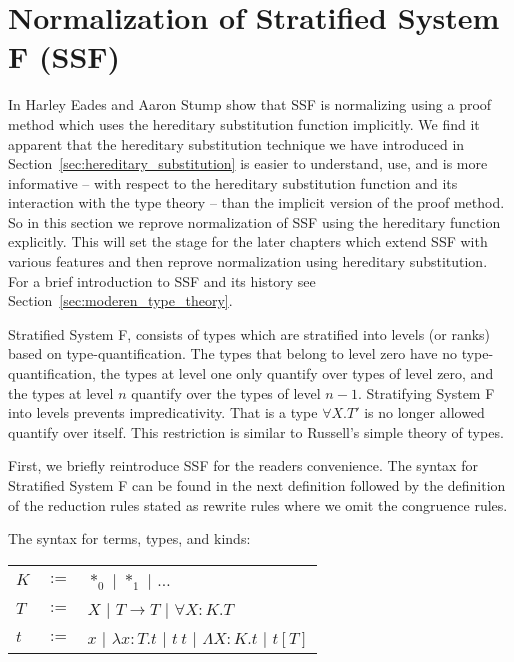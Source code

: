 \section{Normalization of Stratified System F (SSF)}
\label{subsec:normalization_stratified_system_f}
In \cite{Eades:2010} Harley Eades and Aaron Stump show that SSF is
normalizing using a proof method which uses the hereditary
substitution function implicitly.  We find it apparent that the
hereditary substitution technique we have introduced in
Section~\ref{sec:hereditary_substitution} is easier to understand,
use, and is more informative -- with respect to the hereditary
substitution function and its interaction with the type theory -- than
the implicit version of the proof method.  So in this section we
reprove normalization of SSF using the hereditary function explicitly.
This will set the stage for the later chapters which extend SSF with
various features and then reprove normalization using hereditary
substitution.  For a brief introduction to SSF and its history see
Section~\ref{sec:moderen_type_theory}.

Stratified System F, consists of types which are stratified into
levels (or ranks) based on type-quantification.  The types that belong
to level zero have no type-quantification, the types at level one only
quantify over types of level zero, and the types at level $n$ quantify
over the types of level $n-1$.  Stratifying System F into levels
prevents impredicativity.  That is a type $\forall X.T'$ is no
longer allowed quantify over itself.  This restriction is similar to
Russell's simple theory of types.

First, we briefly reintroduce SSF for the readers convenience.  The
syntax for Stratified System F can be found in the next definition
followed by the definition of the reduction rules stated as rewrite
rules where we omit the congruence rules.
\begin{definition}
  \label{def:syntax_ssf}
  The syntax for terms, types, and kinds:
  \begin{center}
    \begin{tabular}{lll}
      $K$ & $:=$ & $*_0$ $|$ $*_1$             $|$ $\ldots$\\
      $T$ & $:=$ & $X$   $|$ $T \rightarrow T$ $|$ $\forall X:K.T$\\
      $t$ & $:=$ & $x$   $|$ $\lambda x:T.t$   $|$ $t\ t$ $|$ $\Lambda X:K.t$ $|$ $t[T]$\\
    \end{tabular}
  \end{center}
\end{definition}

